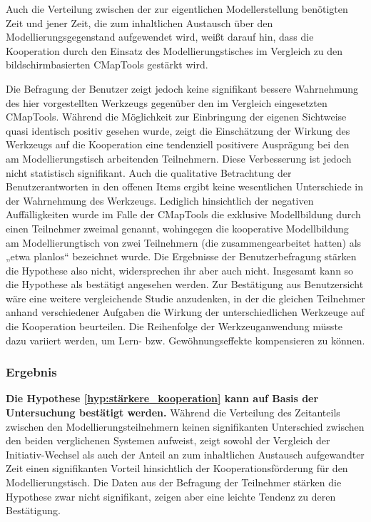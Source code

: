 Auch die Verteilung zwischen der zur eigentlichen Modellerstellung benötigten Zeit und jener Zeit, die zum inhaltlichen Austausch über den Modellierungsgegenstand aufgewendet wird, weißt darauf hin, dass die Kooperation durch den Einsatz des Modellierungstisches im Vergleich zu den bildschirmbasierten CMapTools gestärkt wird.

Die Befragung der Benutzer zeigt jedoch keine signifikant bessere Wahrnehmung des hier vorgestellten Werkzeugs gegenüber den im Vergleich eingesetzten CMapTools. Während die Möglichkeit zur Einbringung der eigenen Sichtweise quasi identisch positiv gesehen wurde, zeigt die Einschätzung der Wirkung des Werkzeugs auf die Kooperation eine tendenziell positivere Ausprägung bei den am Modellierungstisch arbeitenden Teilnehmern. Diese Verbesserung ist jedoch nicht statistisch signifikant. Auch die qualitative Betrachtung der Benutzerantworten in den offenen Items ergibt keine wesentlichen Unterschiede in der Wahrnehmung des Werkzeugs. Lediglich hinsichtlich der negativen Auffälligkeiten wurde im Falle der CMapTools die exklusive Modellbildung durch einen Teilnehmer zweimal genannt, wohingegen die kooperative Modellbildung am Modellierungtisch von zwei Teilnehmern (die zusammengearbeitet hatten) als „etwa planlos“ bezeichnet wurde. Die Ergebnisse der Benutzerbefragung stärken die Hypothese also nicht, widersprechen ihr aber auch nicht. Insgesamt kann so die Hypothese als bestätigt angesehen werden. Zur Bestätigung aus Benutzersicht wäre eine weitere vergleichende Studie anzudenken, in der die gleichen Teilnehmer anhand verschiedener Aufgaben die Wirkung der unterschiedlichen Werkzeuge auf die Kooperation beurteilen. Die Reihenfolge der Werkzeuganwendung müsste dazu variiert werden, um Lern- bzw. Gewöhnungseffekte kompensieren zu können.

\subsubsection{Ergebnis} %

\textbf{Die Hypothese \ref{hyp:stärkere_kooperation} kann auf Basis der Untersuchung bestätigt werden.} Während die Verteilung des Zeitanteils zwischen den Modellierungsteilnehmern keinen signifikanten Unterschied zwischen den beiden verglichenen Systemen aufweist, zeigt sowohl der Vergleich der Initiativ-Wechsel als auch der Anteil an zum inhaltlichen Austausch aufgewandter Zeit einen signifikanten Vorteil hinsichtlich der Kooperationsförderung für den Modellierungstisch. Die Daten aus der Befragung der Teilnehmer stärken die Hypothese zwar nicht signifikant, zeigen aber eine leichte Tendenz zu deren Bestätigung. 

